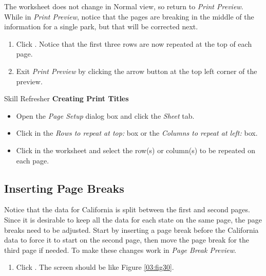 The worksheet does not change in Normal view, so return to \textit{Print Preview}. While in \textit{Print Preview}, notice that the pages are breaking in the middle of the information for a single park, but that will be corrected next.

\begin{enumbox}
	\begin{enumerate}
		\item Click . Notice that the first three rows are now repeated at the top of each page.
		\item Exit \textit{Print Preview} by clicking the arrow button at the top left corner of the preview.
	\end{enumerate}
\end{enumbox}

\begin{center}
	\begin{sklbox}{Skill Refresher}
		\textbf{Creating Print Titles}
		\\
		\begin{itemize}
			\setlength{\itemsep}{0pt}
			\setlength{\parskip}{0pt}
			\setlength{\parsep}{0pt}

			\item Open the \textit{Page Setup} dialog box and click the \textit{Sheet} tab.
			\item Click in the \textit{Rows to repeat at top:} box or the \textit{Columns to repeat at left:} box.
			\item Click in the worksheet and select the row(s) or column(s) to be repeated on each page.
						
		\end{itemize}
	\end{sklbox}
\end{center}

\subsection{Inserting Page Breaks}

Notice that the data for California is split between the first and second pages. Since it is desirable to keep all the data for each state on the same page, the page breaks need to be adjusted. Start by inserting a page break before the California data to force it to start on the second page, then move the page break for the third page if needed. To make these changes work in \textit{Page Break Preview}.

\begin{enumbox}
	\begin{enumerate}
		\item Click . The screen should be like Figure \ref{03:fig30}.
	\end{enumerate}
\end{enumbox}
	
